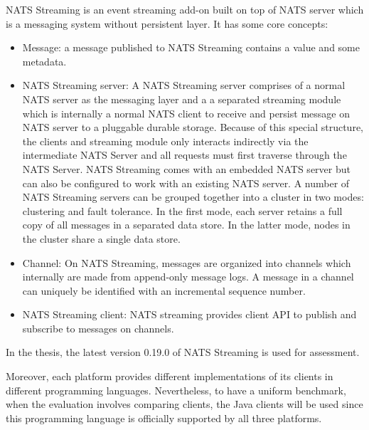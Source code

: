 NATS Streaming is an event streaming add-on built on top of NATS server which is a messaging system without persistent layer. It has some core concepts:
\begin{itemize}
	\item Message: a message published to NATS Streaming contains a value and some metadata.	
	\item NATS Streaming server: A NATS Streaming server comprises of a normal NATS server as the messaging layer and a a separated streaming module which is internally a normal NATS client to receive and persist message on NATS server to a pluggable durable storage.  Because of this special structure, the clients and streaming module only interacts indirectly via the intermediate NATS Server and all requests must first traverse through the NATS Server. NATS Streaming comes with an embedded NATS server but can also be configured to work with an existing NATS server. A number of NATS Streaming servers can be grouped together into a cluster in two modes: clustering and fault tolerance. In the first mode, each server retains a full copy of all messages in a separated data store. In the latter mode, nodes in the cluster share a single data store.
	\item Channel: On NATS Streaming, messages are organized into channels which internally are made from append-only message logs. A message in a channel can uniquely be identified with an incremental sequence number.
	\item NATS Streaming client: NATS streaming provides client API to publish and subscribe to messages on channels.  
\end{itemize}
In the thesis, the latest version 0.19.0 of NATS Streaming is used for assessment.

Moreover, each platform provides different implementations of its clients in different programming languages. Nevertheless, to have a uniform benchmark, when the evaluation involves comparing clients, the Java clients will be used since this programming language is officially supported by all three platforms.












